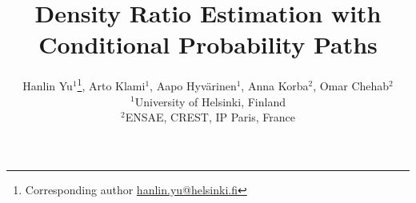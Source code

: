 \documentclass[a4paper,english,10pt]{article}
\begin{document}
\title{Density Ratio Estimation with Conditional Probability Paths}
\date{}

\author{
    {Hanlin Yu}$^{1}$\footnote{
    Corresponding author \href{mailto:[hanlin.yu@helsinki.fi]]}{hanlin.yu@helsinki.fi}},
    {Arto Klami}$^{1}$,
    {Aapo Hyv{\"a}rinen}$^{1}$,
    {Anna Korba}$^{2}$,
    {Omar Chehab}$^{2}$
    \\ [.8em]
    $^1${University of Helsinki, Finland} \\
    $^2${ENSAE, CREST, IP Paris, France}
}


\maketitle

\begin{abstract}
    
\end{abstract}











\vskip 0.2in


\newpage

\end{document}
